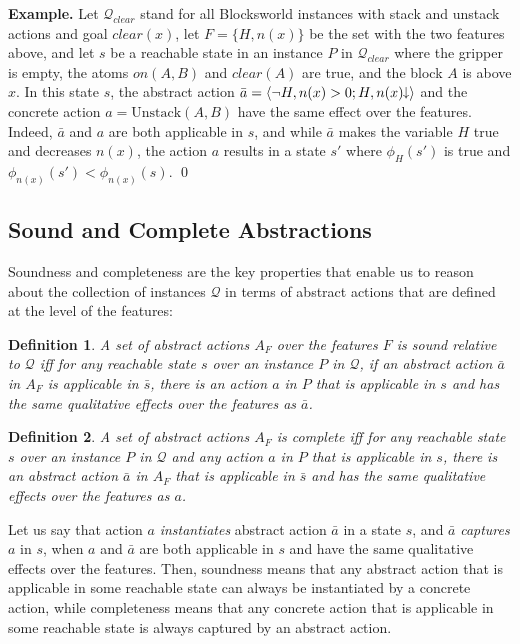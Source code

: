 \documentclass[letterpaper]{article} %
\newcommand{\tup}[1]{\langle #1 \rangle}
\newtheorem{definition}{Definition}
\newenvironment{example}{\noindent\textbf{Example.}\xspace}{\qed}
\newcommand{\Q}{\mathcal{Q}}
\newcommand{\abst}[2]{\tup{#1;#2}}
\newcommand{\mminus}{\hspace{-.05em}\raisebox{.15ex}{\footnotesize$\downarrow$}}
\begin{document}
\medskip
\begin{example}
Let $\Q_{clear}$ stand for  all  Blocksworld instances with stack and unstack actions and goal $clear(x)$,
let $F=\{H,n(x)\}$ be the set with the two features above, and let $s$ be a reachable state in an instance $P$
in $\Q_{clear}$
where the gripper is empty, the atoms $on(A,B)$ and $clear(A)$ are true, and the block $A$ is above $x$.
In this state $s$,
the abstract action $\bar{a}=\abst{\neg H,n(x)>0}{H,n(x)\mminus}$
and the concrete  action  $a=\text{Unstack}(A,B)$ have the same effect over the features.
Indeed, $\bar{a}$ and $a$  are both applicable in $s$, and while $\bar{a}$ makes the variable $H$ true and decreases
$n(x)$, the action $a$ results in a state $s'$ where $\phi_{H}(s')$ is true and $\phi_{n(x)}(s') < \phi_{n(x)}(s)$.
\end{example}


\subsection{Sound and Complete Abstractions}

Soundness and completeness are the key  properties that  enable us to reason about the collection of
instances $\Q$ in terms of abstract actions that are defined at the level of the features:

\begin{definition}
A set of abstract actions $A_F$ over the features $F$ is \emph{sound} relative to 
$\Q$ iff for any reachable state $s$ over an   instance $P$ in $\Q$,
if an abstract action $\bar{a}$ in $A_F$ is applicable in $\bar{s}$,
there is an  action $a$ in $P$ that is applicable in $s$ and
has the \emph{same qualitative effects} over the features as $\bar{a}$.
\end{definition}

\begin{definition}
A set of abstract actions $A_F$ is \emph{complete} iff for any
reachable state $s$ over an instance $P$ in $\Q$ and any  action $a$
in $P$ that is applicable in $s$, there is an abstract action $\bar{a}$ in
$A_F$ that is applicable in $\bar{s}$ and  has the \emph{same qualitative
effects over the features as $a$.}
\end{definition}

Let us say that  action $a$ \emph{instantiates} abstract action $\bar{a}$ in a state $s$,
and $\bar{a}$ \emph{captures} $a$ in $s$,  when $a$ and $\bar{a}$ are both applicable in $s$ and have the same qualitative effects over the features.
Then, soundness means that any abstract action that is applicable in some reachable state can
always be instantiated by a concrete action, while completeness  means that any concrete action that is applicable in some reachable state 
is always captured by an abstract action.  
\end{document}
